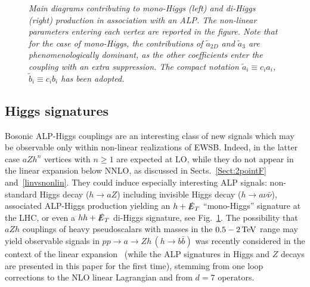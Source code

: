 \documentclass[11pt]{article}
\newcommand{\at}{\tilde{a}}
\newcommand{\bt}{\tilde{b}}
\newcommand{\ETmiss}{\slashed{E}_T}
\renewcommand{\to}{\rightarrow}
\renewcommand{\[}{\begin{equation}}
\renewcommand{\]}{\end{equation}}
\newcounter{diagram}
\begin{document}
\begin{figure}[t]\centering

\caption{\it\small Main diagrams contributing to mono-Higgs (left) and di-Higgs (right) production in association with an ALP. The non-linear 
parameters entering each vertex are reported in the figure. Note that for the case of mono-Higgs, the contributions of $\at_{2D}$ and $\at_3$ are 
phenomenologically dominant, as the other coefficients enter the coupling with an extra suppression. The compact notation 
$\at_i\equiv c_i a_i$, $\bt_i\equiv c_i b_i$ has been adopted.}\label{Plots_monoh_dih}
\end{figure}




\vspace{-2mm}


\subsection{Higgs signatures}
\label{Sect:Higgs_signatures}
 Bosonic ALP-Higgs couplings are an interesting class of new signals which may be observable only within non-linear realizations of EWSB. Indeed, in the 
 latter case $aZh^{n}$ vertices with $n \geq 1$ are expected at LO, while they do not appear in the linear expansion below NNLO, as discussed 
 in Sects.~\ref{Sect:2pointF} and~\ref{linvsnonlin}.  They could induce especially interesting ALP signals:  non-standard Higgs decay ($h\rightarrow a Z$) including invisible Higgs decay  ($h\rightarrow a \nu\bar{\nu}$), associated ALP-Higgs production 
yielding an $h + \ETmiss$ ``mono-Higgs'' signature at the LHC, or even a $ hh+\ETmiss$ di-Higgs signature, see Fig.~\ref{Plots_monoh_dih}. 
The possibility that $aZh$ couplings of heavy pseudoscalars with masses in the $\unit[0.5-2]{TeV}$ range may yield observable signals 
in $pp \to a \to Zh  \,(h\to b\bar{b})$ was recently considered in the context of the linear expansion~\cite{Bauer:2016zfj}
(while the ALP signatures in Higgs and $Z$ decays are presented in this paper for the first time), 
stemming from one loop corrections to the NLO linear Lagrangian and from $d=7$ operators.
\end{document}
